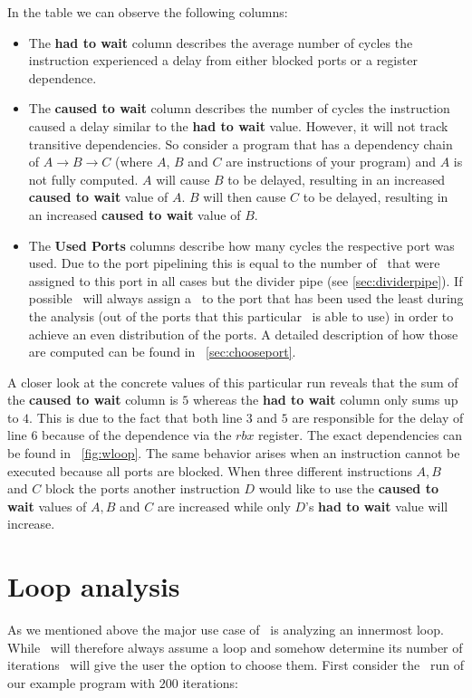 In the table we can observe the following columns:
\begin{itemize}
    \item The \textbf{had to wait} column describes the average number of cycles the instruction experienced a delay from either blocked ports or a register dependence. 
    \item The \textbf{caused to wait} column describes the number of cycles the instruction caused a delay similar to the \textbf{had to wait} value. However, it will not track transitive dependencies. So consider a program that has a dependency chain of $A \rightarrow B \rightarrow C$ (where $A$, $B$ and $C$ are instructions of your program) and $A$ is not fully computed. $A$ will cause $B$ to be delayed, resulting in an increased \textbf{caused to wait} value of $A$. $B$ will then cause $C$ to be delayed, resulting in an increased \textbf{caused to wait} value of $B$.
    \item The \textbf{Used Ports} columns describe how many cycles the respective port was used. Due to the port pipelining this is equal to the number of \microops\ that were assigned to this port in all cases but the divider pipe (see \autoref{sec:dividerpipe}). If possible \suaca\ will always assign a \microop\ to the port that has been used the least during the analysis (out of the ports that this particular \microop\ is able to use) in order to achieve an even distribution of the ports. A detailed description of how those are computed can be found in ~\autoref{sec:chooseport}.
\end{itemize}

A closer look at the concrete values of this particular run reveals that the sum of the \textbf{caused to wait} column is $5$ whereas the \textbf{had to wait} column only sums up to $4$. This is due to the fact that both line $3$ and $5$ are responsible for the delay of line $6$ because of the dependence via the $rbx$ register. The exact dependencies can be found in ~\autoref{fig:wloop}. The same behavior arises when an instruction cannot be executed because all ports are blocked. When three different instructions $A, B$ and $C$ block the ports another instruction $D$ would like to use the \textbf{caused to wait} values of $A, B$ and $C$ are increased while only $D$'s \textbf{had to wait} value will increase.




\section{Loop analysis}
\label{sec:loop}
As we mentioned above the major use case of \iaca\ is analyzing an innermost loop. While \iaca\ will therefore always assume a loop and somehow determine its number of iterations \suaca\ will give the user the option to choose them. First consider the \suaca\ run of our example program with $200$ iterations:

